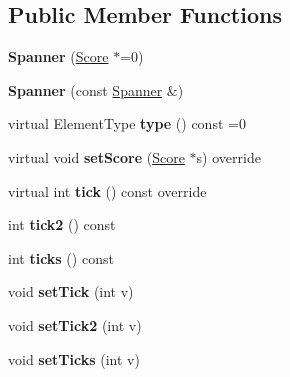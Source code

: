 \subsection*{Public Member Functions}
\begin{DoxyCompactItemize}
\item 
\mbox{\label{class_ms_1_1_spanner_a9b3e2c30a3254a0e43cbf312172efd4a}} 
{\bfseries Spanner} (\hyperlink{class_ms_1_1_score}{Score} $\ast$=0)
\item 
\mbox{\label{class_ms_1_1_spanner_a1fba05cdeb60e70302c8220bb66ab7ac}} 
{\bfseries Spanner} (const \hyperlink{class_ms_1_1_spanner}{Spanner} \&)
\item 
\mbox{\label{class_ms_1_1_spanner_a83531d51784fd1e21df2e4e396045885}} 
virtual Element\+Type {\bfseries type} () const =0
\item 
\mbox{\label{class_ms_1_1_spanner_a516e9a9ce16d41ef6f2585012c718d62}} 
virtual void {\bfseries set\+Score} (\hyperlink{class_ms_1_1_score}{Score} $\ast$s) override
\item 
\mbox{\label{class_ms_1_1_spanner_ab46c1390a7fb1a8cbbc98c63b4f7abdb}} 
virtual int {\bfseries tick} () const override
\item 
\mbox{\label{class_ms_1_1_spanner_af75157012a1d680ba55d464a9c2b14bb}} 
int {\bfseries tick2} () const
\item 
\mbox{\label{class_ms_1_1_spanner_a841aca5a1f0733ab21d4c5943d0c7c61}} 
int {\bfseries ticks} () const
\item 
\mbox{\label{class_ms_1_1_spanner_a3e023390eec16b70bd18ee365b395520}} 
void {\bfseries set\+Tick} (int v)
\item 
\mbox{\label{class_ms_1_1_spanner_acf7389c3aaf850a2d559e291a7ee607d}} 
void {\bfseries set\+Tick2} (int v)
\item 
\mbox{\label{class_ms_1_1_spanner_a639b68ac56f2c4c35a1c75224dc3c333}} 
void {\bfseries set\+Ticks} (int v)

\end{DoxyCompactItemize}
